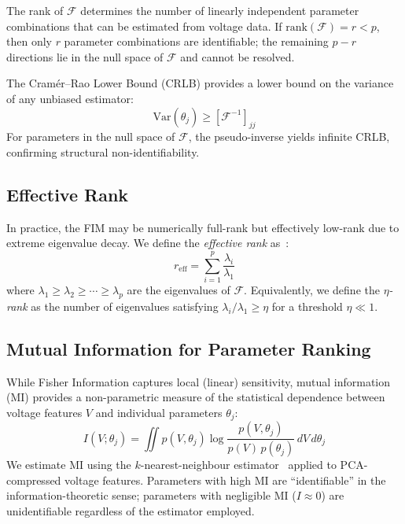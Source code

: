 \documentclass[preprint,12pt]{elsarticle}
\begin{document}
The rank of $\mathcal{F}$ determines the number of linearly independent parameter combinations that can be estimated from voltage data.
If $\mathrm{rank}(\mathcal{F}) = r < p$, then only $r$ parameter combinations are identifiable; the remaining $p - r$ directions lie in the null space of $\mathcal{F}$ and cannot be resolved.

The Cram\'er--Rao Lower Bound (CRLB) provides a lower bound on the variance of any unbiased estimator:
\begin{equation}
\mathrm{Var}(\hat{\theta}_j) \geq [\mathcal{F}^{-1}]_{jj}
\label{eq:crlb}
\end{equation}
For parameters in the null space of $\mathcal{F}$, the pseudo-inverse yields infinite CRLB, confirming structural non-identifiability.

\subsection{Effective Rank}
\label{sec:effrank}

In practice, the FIM may be numerically full-rank but effectively low-rank due to extreme eigenvalue decay.
We define the \emph{effective rank} as~\cite{Roy2007}:
\begin{equation}
r_{\mathrm{eff}} = \sum_{i=1}^{p} \frac{\lambda_i}{\lambda_1}
\label{eq:effrank}
\end{equation}
where $\lambda_1 \geq \lambda_2 \geq \cdots \geq \lambda_p$ are the eigenvalues of $\mathcal{F}$.
Equivalently, we define the \emph{$\eta$-rank} as the number of eigenvalues satisfying $\lambda_i / \lambda_1 \geq \eta$ for a threshold $\eta \ll 1$.

\subsection{Mutual Information for Parameter Ranking}
\label{sec:mi}

While Fisher Information captures local (linear) sensitivity, mutual information (MI) provides a non-parametric measure of the statistical dependence between voltage features $V$ and individual parameters $\theta_j$:
\begin{equation}
I(V; \theta_j) = \iint p(V, \theta_j) \log \frac{p(V, \theta_j)}{p(V)\,p(\theta_j)} \,dV\,d\theta_j
\label{eq:mi}
\end{equation}
We estimate MI using the $k$-nearest-neighbour estimator~\cite{Kraskov2004} applied to PCA-compressed voltage features.
Parameters with high MI are ``identifiable'' in the information-theoretic sense; parameters with negligible MI ($I \approx 0$) are unidentifiable regardless of the estimator employed.
\end{document}
